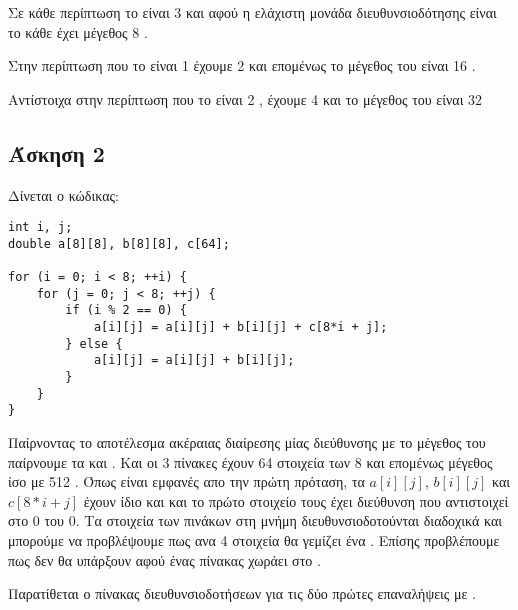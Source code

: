 \documentclass[10pt]{assignment}f
\begin{document}
Σε κάθε περίπτωση το  είναι 3  και αφού η ελάχιστη μονάδα διευθυνσιοδότησης είναι το  κάθε  έχει μέγεθος 8 .
 
Στην περίπτωση που το  είναι 1  έχουμε 2  και επομένως το μέγεθος του  είναι 16 .

Αντίστοιχα στην περίπτωση που το  είναι 2 , έχουμε 4
 και το μέγεθος του  είναι 32 	

\newpage
\subsection*{Άσκηση 2}

Δίνεται ο κώδικας:
\begin{center}
\begin{verbatim}
int i, j;
double a[8][8], b[8][8], c[64];

for (i = 0; i < 8; ++i) {
    for (j = 0; j < 8; ++j) {
        if (i % 2 == 0) {
            a[i][j] = a[i][j] + b[i][j] + c[8*i + j];
        } else {
            a[i][j] = a[i][j] + b[i][j];
        }
    }
}
\end{verbatim}
\end{center}
Παίρνοντας το αποτέλεσμα ακέραιας διαίρεσης μίας διεύθυνσης με το μέγεθος του 
παίρνουμε τα  και . Και οι 3 πίνακες έχουν 64 στοιχεία των 8 
 και επομένως μέγεθος ίσο με 512 . Όπως είναι εμφανές απο την πρώτη πρόταση, τα $a[i][j]$, $b[i][j]$ και $c[8*i+j]$ έχουν ίδιο  και  και το πρώτο στοιχείο τους έχει διεύθυνση που αντιστοιχεί στο  0 του  0. Τα στοιχεία των πινάκων στη μνήμη διευθυνσιοδοτούνται διαδοχικά και μπορούμε να προβλέψουμε πως ανα 4 στοιχεία θα γεμίζει ένα . Επίσης προβλέπουμε πως δεν θα
υπάρξουν  αφού ένας πίνακας χωράει στο . 

Παρατίθεται ο πίνακας διευθυνσιοδοτήσεων για τις δύο πρώτες επαναλήψεις με .
\end{document}
